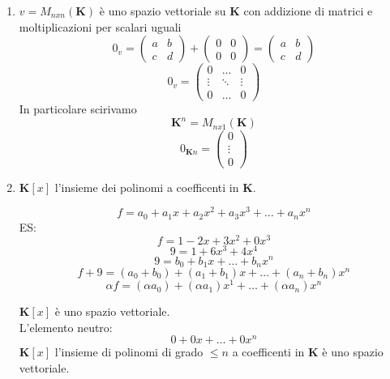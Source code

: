 \documentclass[12pt]{article}
\begin{document}
\begin{enumerate}
    \item $v = M_{nxn} (\mathbf{K})$ è uno spazio vettoriale su $\mathbf{K}$ con addizione di matrici e moltiplicazioni per scalari uguali
    \[0_v = \begin{pmatrix}
        a & b\\
        c & d
    \end{pmatrix} + \begin{pmatrix}
        0 & 0\\
        0 & 0
    \end{pmatrix} = \begin{pmatrix}
        a & b\\
        c & d
    \end{pmatrix}\]
    \[0_v = \begin{pmatrix}
        0 & \dots & 0\\
        \vdots & \ddots & \vdots\\
        0 & \dots & 0
    \end{pmatrix}\]
In particolare scirivamo
\[\mathbf{K}^n = M_{nx1} (\mathbf{K})\]
\[0_{\mathbf{K}n} = \begin{pmatrix}
    0\\
    \vdots\\
    0
\end{pmatrix}\]
\item $\mathbf{K}[x]$ l'insieme dei polinomi a coefficenti in $\mathbf{K}$.

\[f = a_0 + a_1x + a_2x^2 + a_3x^3 + \dots + a_nx^n\]
ES:
\[f = 1 - 2x + 3x^2 + 0x^3\]
\[9 = 1 + 6x^3 + 4x^4\]
\[9 = b_0 + b_1x + \dots + b_nx^n\]
\[f + 9 = (a_0 + b_0) + (a_1+b_1)x + \dots + (a_n+b_n)x^n\]
\[\alpha f = (\alpha a_0) + (\alpha a_1)x^1 + \dots + (\alpha a_n)x^n \]

\begin{center}
    $\mathbf{K}[x]$ è uno spazio vettoriale.\\
    L'elemento neutro:
    \[0 + 0x + \dots + 0x^n\]
    $\mathbf{K}[x]$ l'insieme di polinomi di grado $\le n$ a coefficenti in $\mathbf{K}$ è uno spazio vettoriale.
\end{center}


\end{enumerate}
\end{document}
